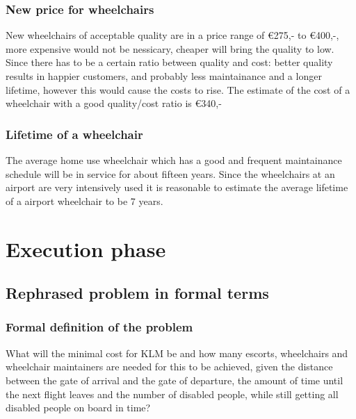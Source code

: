 \documentclass[a4paper, 11pt, notitlepage]{report}
\begin{document}
    \subsection{New price for wheelchairs}
    New wheelchairs of acceptable quality are in a price range of \euro{275,-} to \euro{400,-}, more expensive would not be nessicary, cheaper will bring the quality to low. Since there has to be a certain ratio between quality and cost: better quality results in happier customers, and probably less maintainance and a longer lifetime, however this would cause the costs to rise. The estimate of the cost of a wheelchair with a good quality/cost ratio is \euro{340,-}
    \subsection{Lifetime of a wheelchair}
    The average home use wheelchair which has a good and frequent maintainance schedule will be in service for about fifteen years. Since the wheelchairs at an airport are very intensively used it is reasonable to estimate the average lifetime of a airport wheelchair to be 7 years.
\chapter{Execution phase}
\section{Rephrased problem in formal terms}

	\subsection{Formal definition of the problem}
	What will the minimal cost for KLM be and how many escorts, wheelchairs and wheelchair maintainers are needed for this to be achieved, given the distance between the gate of arrival and the gate of departure, the amount of time until the next flight leaves and the number of disabled people, while still getting all disabled people on board in time?
	
\end{document}
